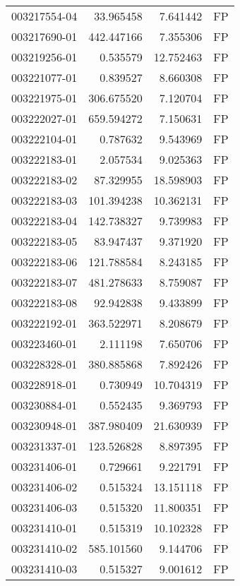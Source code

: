 \begin{tabular}{lrrl}
003217554-04 &   33.965458 &       7.641442 &   FP \\
003217690-01 &  442.447166 &       7.355306 &   FP \\
003219256-01 &    0.535579 &      12.752463 &   FP \\
003221077-01 &    0.839527 &       8.660308 &   FP \\
003221975-01 &  306.675520 &       7.120704 &   FP \\
003222027-01 &  659.594272 &       7.150631 &   FP \\
003222104-01 &    0.787632 &       9.543969 &   FP \\
003222183-01 &    2.057534 &       9.025363 &   FP \\
003222183-02 &   87.329955 &      18.598903 &   FP \\
003222183-03 &  101.394238 &      10.362131 &   FP \\
003222183-04 &  142.738327 &       9.739983 &   FP \\
003222183-05 &   83.947437 &       9.371920 &   FP \\
003222183-06 &  121.788584 &       8.243185 &   FP \\
003222183-07 &  481.278633 &       8.759087 &   FP \\
003222183-08 &   92.942838 &       9.433899 &   FP \\
003222192-01 &  363.522971 &       8.208679 &   FP \\
003223460-01 &    2.111198 &       7.650706 &   FP \\
003228328-01 &  380.885868 &       7.892426 &   FP \\
003228918-01 &    0.730949 &      10.704319 &   FP \\
003230884-01 &    0.552435 &       9.369793 &   FP \\
003230948-01 &  387.980409 &      21.630939 &   FP \\
003231337-01 &  123.526828 &       8.897395 &   FP \\
003231406-01 &    0.729661 &       9.221791 &   FP \\
003231406-02 &    0.515324 &      13.151118 &   FP \\
003231406-03 &    0.515320 &      11.800351 &   FP \\
003231410-01 &    0.515319 &      10.102328 &   FP \\
003231410-02 &  585.101560 &       9.144706 &   FP \\
003231410-03 &    0.515327 &       9.001612 &   FP \\

\end{tabular}
